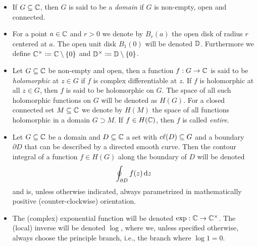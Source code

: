 \begin{itemize}[label=$\rightsquigarrow$]
    \item If $G \subseteq \mathbb{C}$, then $G$ is said to be a \emph{domain} if $G$ is non-empty, open and connected.
    \item For a point $a \in \mathbb{C}$ and $r > 0$ we denote by $B_r(a)$ the open disk of radius $r$ centered at $a$. The open unit disk $B_1(0)$ will be denoted $\mathbb{D}$. Furthermore we define $\mathbb{C}^\times \coloneqq \mathbb{C} \setminus \{ 0 \}$ and $\mathbb{D}^\times \coloneqq \mathbb{D} \setminus \{ 0 \}$.
    \item Let $G \subseteq \mathbb{C}$ be non-empty and open, then a function $f : G \to \mathbb{C}$ is said to be \emph{holomorphic} at $z \in G$ if $f$ is complex differentiable at $z$. If $f$ is holomorphic at all $z \in G$, then $f$ is said to be holomorphic on $G$. The space of all such holomorphic functions on $G$ will be denoted as $H(G)$. For a closed connected set $M \subseteq \mathbb{C}$ we denote by $H(M)$ the space of all functions holomorphic in a domain $G \supset M$. If $f \in H(\mathbb{C})$, then $f$ is called \emph{entire}.
    \item Let $G \subseteq \mathbb{C}$ be a domain and $D \subseteq \mathbb{C}$ a set with $c\ell({D}) \subseteq G$ and a boundary $\partial D$ that can be described by a directed smooth curve. Then the contour integral of a function $f \in H(G)$ along the boundary of $D$ will be denoted
    $$ \oint_{\partial D} f(z) \mathop{}\!\mathrm{d} z $$
    and is, unless otherwise indicated, always parametrized in mathematically positive (counter-clockwise) orientation.
    \item The (complex) exponential function will be denoted $\exp : \mathbb{C} \to \mathbb{C}^\times$. The (local) inverse will be denoted $\log$, where we, unless specified otherwise, always choose the principle branch, i.e., the branch where $\log 1 = 0$.
\end{itemize}
